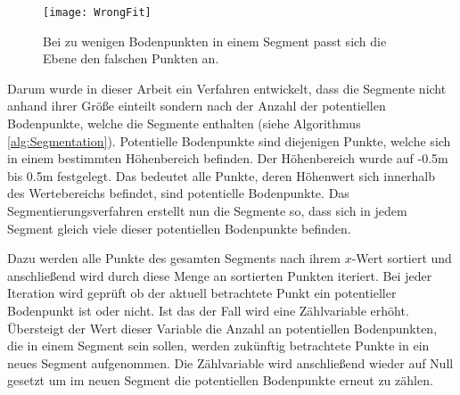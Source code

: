 \begin{figure}%
	\centering
    \texttt{[image: WrongFit]}
    \caption{Bei zu wenigen Bodenpunkten in einem Segment passt sich die Ebene den falschen Punkten an.}
    \label{fig:WrongFit}
\end{figure}

Darum wurde in dieser Arbeit ein Verfahren entwickelt, dass die Segmente nicht anhand ihrer Größe einteilt sondern nach der Anzahl der potentiellen Bodenpunkte, welche die Segmente enthalten (siehe Algorithmus \ref{alg:Segmentation}). Potentielle Bodenpunkte sind diejenigen Punkte, welche sich in einem bestimmten Höhenbereich befinden. Der Höhenbereich wurde auf -0.5m bis 0.5m festgelegt. Das bedeutet alle Punkte, deren Höhenwert sich innerhalb des Wertebereichs befindet, sind potentielle Bodenpunkte. Das Segmentierungsverfahren erstellt nun die Segmente so, dass sich in jedem Segment gleich viele dieser potentiellen Bodenpunkte befinden. 

Dazu werden alle Punkte des gesamten Segments nach ihrem $x$-Wert sortiert und anschließend wird durch diese Menge an sortierten Punkten iteriert. Bei jeder Iteration wird geprüft ob der aktuell betrachtete Punkt ein potentieller Bodenpunkt ist oder nicht. Ist das der Fall wird eine Zählvariable erhöht. Übersteigt der Wert dieser Variable die Anzahl an potentiellen Bodenpunkten, die in einem Segment sein sollen, werden zukünftig betrachtete Punkte in ein neues Segment aufgenommen. Die Zählvariable wird anschließend wieder auf Null gesetzt um im neuen Segment die potentiellen Bodenpunkte erneut zu zählen.    


